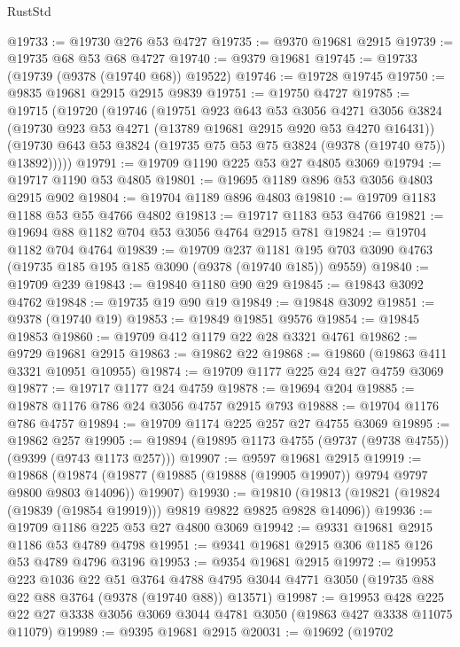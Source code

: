 \begin{lexlean}{RustStd}
\begin{coremodule}
@19733 := @19730 @276 @53 @4727
@19735 := @9370 @19681 @2915
@19739 := @19735 @68 @53 @68 @4727
@19740 := @9379 @19681
@19745 := @19733 (@19739 (@9378 (@19740 @68)) @19522)
@19746 := @19728 @19745
@19750 := @9835 @19681 @2915 @2915 @9839
@19751 := @19750 @4727
@19785 := @19715
    (@19720
      (@19746
        (@19751
          @923
          @643
          @53
          @3056
          @4271
          @3056
          @3824
          (@19730 @923 @53 @4271 (@13789 @19681 @2915 @920 @53 @4270 @16431))
          (@19730 @643 @53 @3824 (@19735 @75 @53 @75 @3824 (@9378 (@19740 @75)) @13892)))))
@19791 := @19709 @1190 @225 @53 @27 @4805 @3069
@19794 := @19717 @1190 @53 @4805
@19801 := @19695 @1189 @896 @53 @3056 @4803 @2915 @902
@19804 := @19704 @1189 @896 @4803
@19810 := @19709 @1183 @1188 @53 @55 @4766 @4802
@19813 := @19717 @1183 @53 @4766
@19821 := @19694 @88 @1182 @704 @53 @3056 @4764 @2915 @781
@19824 := @19704 @1182 @704 @4764
@19839 := @19709
    @237
    @1181
    @195
    @703
    @3090
    @4763
    (@19735 @185 @195 @185 @3090 (@9378 (@19740 @185)) @9559)
@19840 := @19709 @239
@19843 := @19840 @1180 @90 @29
@19845 := @19843 @3092 @4762
@19848 := @19735 @19 @90 @19
@19849 := @19848 @3092
@19851 := @9378 (@19740 @19)
@19853 := @19849 @19851 @9576
@19854 := @19845 @19853
@19860 := @19709 @412 @1179 @22 @28 @3321 @4761
@19862 := @9729 @19681 @2915
@19863 := @19862 @22
@19868 := @19860 (@19863 @411 @3321 @10951 @10955)
@19874 := @19709 @1177 @225 @24 @27 @4759 @3069
@19877 := @19717 @1177 @24 @4759
@19878 := @19694 @204
@19885 := @19878 @1176 @786 @24 @3056 @4757 @2915 @793
@19888 := @19704 @1176 @786 @4757
@19894 := @19709 @1174 @225 @257 @27 @4755 @3069
@19895 := @19862 @257
@19905 := @19894 (@19895 @1173 @4755 (@9737 (@9738 @4755)) (@9399 (@9743 @1173 @257)))
@19907 := @9597 @19681 @2915
@19919 := @19868
    (@19874 (@19877 (@19885 (@19888 (@19905 @19907)) @9794 @9797 @9800 @9803 @14096)) @19907)
@19930 := @19810 (@19813 (@19821 (@19824 (@19839 (@19854 @19919))) @9819 @9822 @9825 @9828 @14096))
@19936 := @19709 @1186 @225 @53 @27 @4800 @3069
@19942 := @9331 @19681 @2915 @1186 @53 @4789 @4798
@19951 := @9341 @19681 @2915 @306 @1185 @126 @53 @4789 @4796 @3196
@19953 := @9354 @19681 @2915
@19972 := @19953
    @223
    @1036
    @22
    @51
    @3764
    @4788
    @4795
    @3044
    @4771
    @3050
    (@19735 @88 @22 @88 @3764 (@9378 (@19740 @88)) @13571)
@19987 := @19953
    @428
    @225
    @22
    @27
    @3338
    @3056
    @3069
    @3044
    @4781
    @3050
    (@19863 @427 @3338 @11075 @11079)
@19989 := @9395 @19681 @2915
@20031 := @19692
    (@19702

\end{coremodule}
\end{lexlean}
